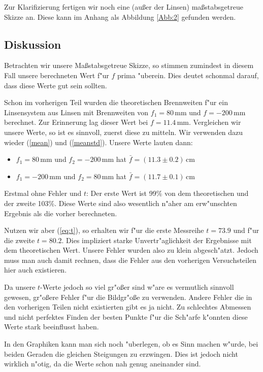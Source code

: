 \documentclass[11pt,a4paper]{article}
\begin{document}
Zur Klarifizierung fertigen wir noch eine (au\ss er der Linsen) ma\ss stabsgetreue Skizze an. Diese kann im Anhang als Abbildung \ref{Abb:2} gefunden werden.\\

\subsection{Diskussion}

Betrachten wir unsere Ma\ss stabsgetreue Skizze, so stimmen zumindest in diesem Fall unsere berechneten Wert f"ur $f$ prima "uberein. Dies deutet schonmal darauf, dass diese Werte gut sein sollten.

Schon im vorherigen Teil wurden die theoretischen Brennweiten f"ur ein Linsensystem aus Linsen mit Brennweiten von $f_1=80$\,mm und $f=-200$\,mm berechnet. Zur Erinnerung lag dieser Wert bei $f=11.4$\,mm. Vergleichen wir unsere Werte, so ist es sinnvoll, zuerst diese zu mitteln. Wir verwenden dazu wieder (\ref{mean}) und (\ref{meanstd}). Unsere Werte lauten dann:

\begin{itemize}
\item $f_1=80\,$mm und $f_2=-200\,$mm hat $\bar{f}=(11.3\pm0.2)$\,cm
\item $f_1=-200\,$mm und $f_2=80\,$mm hat $\bar{f}=(11.7\pm0.1)$\,cm
\end{itemize}

Erstmal ohne Fehler und $t$: Der erste Wert ist 99\% von dem theoretischen und der zweite 103\%. Diese Werte sind also wesentlich n"aher am erw"unschten Ergebnis als die vorher berechneten.

Nutzen wir aber (\ref{eq:t}), so erhalten wir f"ur die erste Messreihe $t=73.9$ und f"ur die zweite $t=80.2$. Dies impliziert starke Unvertr"aglichkeit der Ergebnisse mit dem theoretischen Wert. Unsere Fehler wurden also zu klein abgesch"atzt. Jedoch muss man auch damit rechnen, dass die Fehler aus den vorherigen Versuchsteilen hier auch existieren.

Da unsere $t$-Werte jedoch so viel gr"o\ss er sind w"are es vermutlich sinnvoll gewesen, gr"o\ss ere Fehler f"ur die Bildgr"o\ss e zu verwenden. Andere Fehler die in den vorherigen Teilen nicht existierten gibt es ja nicht. Zu schlechtes Abmessen und nicht perfektes Finden der besten Punkte f"ur die Sch"arfe k"onnten diese Werte stark beeinflusst haben.

In den Graphiken kann man sich noch "uberlegen, ob es Sinn machen w"urde, bei beiden Geraden die gleichen Steigungen zu erzwingen. Dies ist jedoch nicht wirklich n"otig, da die Werte schon nah genug aneinander sind.
\end{document}
